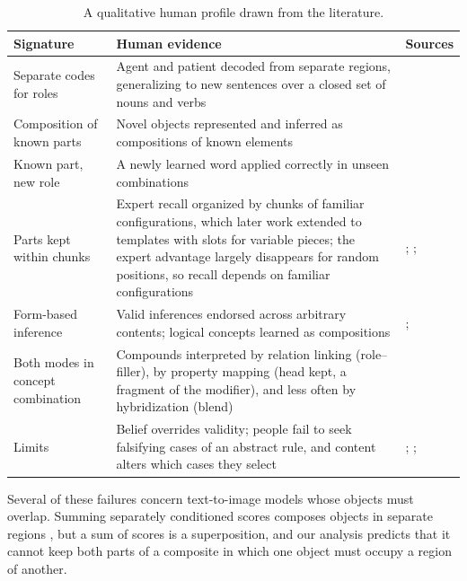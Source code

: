 \documentclass[10pt]{article}
\theoremstyle{plain}
\theoremstyle{remark}
\begin{document}
\label{app:human}
\begin{table}[h]
  \caption{A qualitative human profile drawn from the literature.}
  \label{tab:human}
  \centering\small
  \begin{tabularx}{\linewidth}{@{}P{3.3cm}YP{3.2cm}@{}}
    \toprule
    Signature & Human evidence & Sources \\
    \midrule
    Separate codes for roles & Agent and patient decoded from separate regions, generalizing to new sentences over a closed set of nouns and verbs & \citet{frankland2015} \\
    Composition of known parts & Novel objects represented and inferred as compositions of known elements & \citet{schwartenbeck2023} \\
    Known part, new role & A newly learned word applied correctly in unseen combinations & \citet{lake2019} \\
    Parts kept within chunks & Expert recall organized by chunks of familiar configurations, which later work extended to templates with slots for variable pieces; the expert advantage largely disappears for random positions, so recall depends on familiar configurations & \citet{chase1973}; \citet{gobet1996templates}; \citet{gobet1996} \\
    Form-based inference & Valid inferences endorsed across arbitrary contents; logical concepts learned as compositions & \citet{rips1994}; \citet{piantadosi2016} \\
    Both modes in concept combination & Compounds interpreted by relation linking (role--filler), by property mapping (head kept, a fragment of the modifier), and less often by hybridization (blend) & \citet{wisniewski1997} \\
    Limits & Belief overrides validity; people fail to seek falsifying cases of an abstract rule, and content alters which cases they select & \citet{evans1983}; \citet{wason1968}; \citet{griggs1982} \\
    \bottomrule
  \end{tabularx}
\end{table}

\noindent
Several of these failures concern text-to-image models whose objects must overlap. Summing separately conditioned scores composes objects in separate regions \citep{liu2022composable}, but a sum of scores is a superposition, and our analysis predicts that it cannot keep both parts of a composite in which one object must occupy a region of another.

\end{document}
